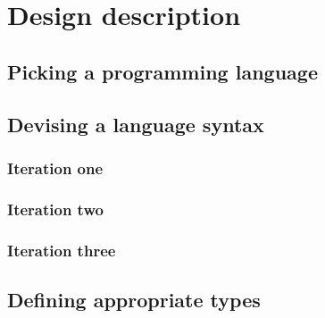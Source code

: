 \section{Design description}
\subsection{Picking a programming language}

\subsection{Devising a language syntax}

\subsubsection{Iteration one}

\subsubsection{Iteration two}

\subsubsection{Iteration three}

\subsection{Defining appropriate types}

